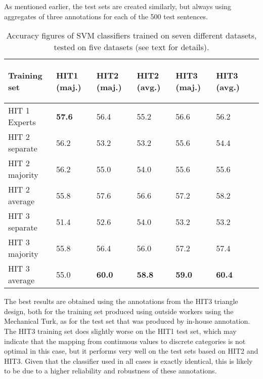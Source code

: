 \documentclass[11pt]{elsarticle}
\begin{document}
As mentioned earlier, the test sets are created similarly, but always using aggregates of three annotations for each of the 500 test sentences.

\begin{table}
\begin{center}
\begin{small}
\begin{tabular}{|l|l|l|l|l|l|l|} \hline
 Training set &
 {\begin{sideways}\parbox{2cm}{\centering HIT1 (maj.)}\end{sideways}} &
 {\begin{sideways}\parbox{2cm}{\centering HIT2 (maj.)}\end{sideways}} &
 {\begin{sideways}\parbox{2cm}{\centering HIT2 (avg.)}\end{sideways}} &
 {\begin{sideways}\parbox{2cm}{\centering HIT3 (maj.)}\end{sideways}} &
 {\begin{sideways}\parbox{2cm}{\centering HIT3 (avg.)}\end{sideways}} \\ \hline
 HIT 1 Experts & \textbf{57.6} & 56.4 & 55.2 & 56.6 & 56.2 \\ \hline \hline
 HIT 2 separate & 56.2 & 53.2 & 53.2 & 55.6 & 54.4 \\ \hline
 HIT 2 majority & 56.2 & 55.0 & 54.0 & 55.6 & 55.6 \\ \hline
 HIT 2 average & 55.8 & 57.6 & 56.6 & 57.2 & 58.2 \\ \hline \hline
 HIT 3 separate & 51.4 & 52.6 & 54.0 & 53.2 & 53.2 \\ \hline
 HIT 3 majority & 55.8 & 56.4 & 56.0 & 57.2 & 57.4 \\ \hline
 HIT 3 average & 55.0 & \textbf{60.0} & \textbf{58.8} & \textbf{59.0} & \textbf{60.4} \\ \hline
\end{tabular}
\end{small}
\end{center}
\caption{Accuracy figures of SVM classifiers trained on seven different datasets, tested on five datasets (see text for details).}
\label{table:class_hit_comparison}
\end{table}

The best results are obtained using the annotations from the HIT3 triangle design, both for the training set produced using outside workers using the Mechanical Turk, as for the test set that was produced by in-house annotation. The HIT3 training set does slightly worse on the HIT1 test set, which may indicate that the mapping from continuous values to discrete categories is not optimal in this case, but it performs very well on the test sets based on HIT2 and HIT3. Given that the classifier used in all cases is exactly identical, this is likely to be due to a higher reliability and robustness of these annotations.
\end{document}
